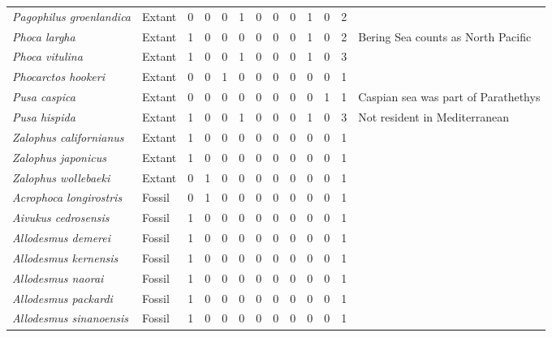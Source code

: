\begin{longtable}{llccccccccccp{}}
\textit{Pagophilus groenlandica} &
Extant &
0 &
0 &
0 &
1 &
0 &
0 &
0 &
1 &
0 &
2 &
\\

\textit{Phoca largha} &
Extant &
1 &
0 &
0 &
0 &
0 &
0 &
0 &
1 &
0 &
2 &
Bering Sea counts as North Pacific\\

\textit{Phoca vitulina} &
Extant &
1 &
0 &
0 &
1 &
0 &
0 &
0 &
1 &
0 &
3 &
\\

\textit{Phocarctos hookeri} &
Extant &
0 &
0 &
1 &
0 &
0 &
0 &
0 &
0 &
0 &
1 &
\\

\textit{Pusa caspica} &
Extant &
0 &
0 &
0 &
0 &
0 &
0 &
0 &
0 &
1 &
1 &
Caspian sea was part of Parathethys\\

\textit{Pusa hispida} &
Extant &
1 &
0 &
0 &
1 &
0 &
0 &
0 &
1 &
0 &
3 &
Not resident in Mediterranean\\

\textit{Zalophus californianus} &
Extant &
1 &
0 &
0 &
0 &
0 &
0 &
0 &
0 &
0 &
1 &
\\

\textit{Zalophus japonicus} &
Extant &
1 &
0 &
0 &
0 &
0 &
0 &
0 &
0 &
0 &
1 &
\\

\textit{Zalophus wollebaeki} &
Extant &
0 &
1 &
0 &
0 &
0 &
0 &
0 &
0 &
0 &
1 &
\\

\textit{Acrophoca longirostris} &
Fossil &
0 &
1 &
0 &
0 &
0 &
0 &
0 &
0 &
0 &
1 &
\\

\textit{Aivukus cedrosensis} &
Fossil &
1 &
0 &
0 &
0 &
0 &
0 &
0 &
0 &
0 &
1 &
\\

\textit{Allodesmus demerei} &
Fossil &
1 &
0 &
0 &
0 &
0 &
0 &
0 &
0 &
0 &
1 &
\\

\textit{Allodesmus kernensis} &
Fossil &
1 &
0 &
0 &
0 &
0 &
0 &
0 &
0 &
0 &
1 &
\\

\textit{Allodesmus naorai} &
Fossil &
1 &
0 &
0 &
0 &
0 &
0 &
0 &
0 &
0 &
1 &
\\

\textit{Allodesmus packardi} &
Fossil &
1 &
0 &
0 & 
0 &
0 &
0 &
0 &
0 &
0 &
1 &
\\

\textit{Allodesmus sinanoensis} &
Fossil &
1 &
0 &
0 &
0 &
0 &
0 &
0 &
0 &
0 &
1 &
\\


\end{longtable}
